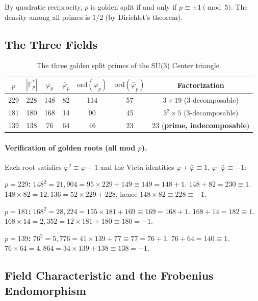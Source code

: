 By quadratic reciprocity, $p$ is golden split if and only if
$p \equiv \pm 1 \pmod{5}$. The density among all primes is $1/2$
(by Dirichlet's theorem).

\subsection{The Three Fields}

\begin{table}[h]
\centering
\caption{The three golden split primes of the SU(3) Center triangle.}
\label{tab:fields}
\begin{tabular}{@{}ccccccc@{}}
\toprule
$p$ & $|{\mathbb{F}_p^*}|$ & $\varphi_p$ & $\bar\varphi_p$
    & $\mathrm{ord}(\varphi_p)$ & $\mathrm{ord}(\bar\varphi_p)$
    & Factorization \\
\midrule
229 & 228 & 148 & 82  & 114 & 57  & $3 \times 19$ (3-decomposable) \\
181 & 180 & 168 & 14  &  90 & 45  & $3^2 \times 5$ (3-decomposable) \\
139 & 138 &  76 & 64  &  46 & 23  & $23$ (\textbf{prime, indecomposable}) \\
\bottomrule
\end{tabular}
\end{table}

\paragraph{Verification of golden roots (all mod $p$).}
Each root satisfies $\varphi^2 \equiv \varphi + 1$ and the Vieta identities
$\varphi + \bar\varphi \equiv 1$, $\varphi \cdot \bar\varphi \equiv -1$:

\medskip
\noindent\textbf{$p = 229$:}
$148^2 = 21{,}904 = 95 \times 229 + 149 \equiv 149 = 148 + 1$.
$148 + 82 = 230 \equiv 1$.
$148 \times 82 = 12{,}136 = 52 \times 229 + 228$,
hence $148 \times 82 \equiv 228 \equiv -1$.

\medskip
\noindent\textbf{$p = 181$:}
$168^2 = 28{,}224 = 155 \times 181 + 169 \equiv 169 = 168 + 1$.
$168 + 14 = 182 \equiv 1$.
$168 \times 14 = 2{,}352 = 12 \times 181 + 180 \equiv 180 = -1$.

\medskip
\noindent\textbf{$p = 139$:}
$76^2 = 5{,}776 = 41 \times 139 + 77 \equiv 77 = 76 + 1$.
$76 + 64 = 140 \equiv 1$.
$76 \times 64 = 4{,}864 = 34 \times 139 + 138 \equiv 138 = -1$.

\subsection{Field Characteristic and the Frobenius Endomorphism}
\label{sec:characteristic}

